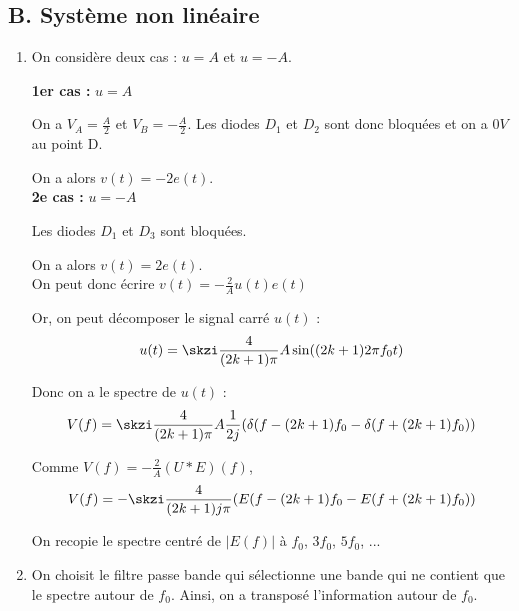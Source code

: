 \documentclass[../../Cours_M1.tex]{subfiles}
\begin{document}
\subsection*{B. Système non linéaire}

\begin{enumerate}
\item On considère deux cas : $u=A$ et $u=-A$.

\textbf{1er cas : } $u = A$

On a $V_A = \frac{A}{2}$ et $V_B = - \frac{A}{2}$. Les diodes $D_1$ et $D_2$ sont donc bloquées et on a $0V$ au point D.

On a alors $v(t) = -2e(t)$.\\

\textbf{2e cas : } $u = - A$ 

Les diodes $D_1$ et $D_3$ sont bloquées.

On a alors $v(t) = 2e(t)$.\\

On peut donc écrire $v(t) = -\frac{2}{A} u(t)e(t) $

Or, on peut décomposer le signal carré $u(t)$ :
\[u(t) = \skzi \frac{4}{(2k+1)\pi} A \sin ((2k+1)2\pi f_0t)\]

Donc on a le spectre de $u(t)$ :
\[V(f) = \skzi \frac{4}{(2k+1)\pi} A \frac{1}{2j}(\delta(f-(2k+1)f_0-\delta(f+(2k+1)f_0))\]

Comme $V(f) = -\frac{2}{A}(U*E)(f)$,
\[V(f) = - \skzi \frac{4}{(2k+1)j\pi} (E(f-(2k+1)f_0-E(f+(2k+1)f_0))\]

On recopie le spectre centré de $|E(f)|$ à $f_0$, $3f_0$, $5f_0$, ...

\item On choisit le filtre passe bande qui sélectionne une bande qui ne contient que le spectre autour de $f_0$. Ainsi, on a transposé l'information autour de $f_0$.

\end{enumerate}
\end{document}
